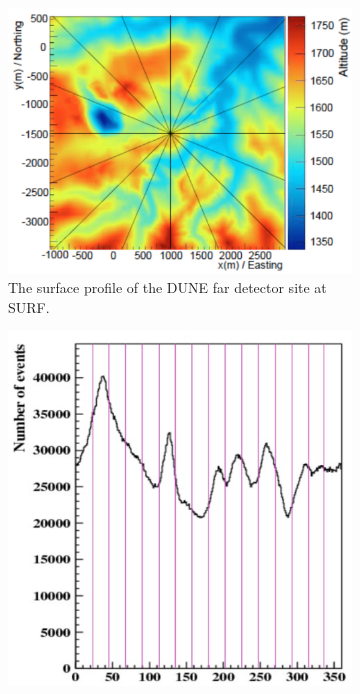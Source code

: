 \begin{figure}
  \centering
  \begin{subfigure}{0.45\textwidth}
    \centering
    \includegraphics[width=\textwidth]{dune-surface-map}
    \caption{The surface profile of the DUNE far detector site at SURF.}
    \label{fig:SurfProf_Col}
  \end{subfigure}
  \hspace{0.08\textwidth}
  \begin{subfigure}{0.45\textwidth}
    \centering
    \includegraphics[width=\textwidth]{phi-map}

\end{subfigure}
\end{figure}
